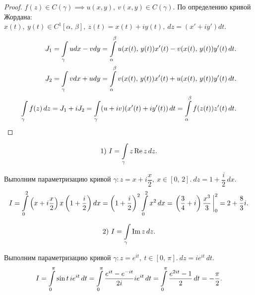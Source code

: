 	\begin{proof}
		$f(z)\in C(\gamma)\implies u(x, y),\ v(x, y)\in C(\gamma) $. По определению кривой Жордана: $x(t),\ y(t)\in C^1[\alpha,\,\beta],\ z(t)= x(t) + iy(t),\ dz = (x' + iy')dt$.
		\begin{align*}
			J_1 = \int\limits_\gamma udx-vdy = \int\limits_\alpha^\beta u(x(t),\, y(t))x'(t)- v(x(t),\, y(t))y'(t)\,dt.\\
			J_2 = \int\limits_\gamma vdx+udy = \int\limits_\alpha^\beta v(x(t),\, y(t))x'(t)+ u(x(t),\, y(t))y'(t)\,dt.\\
			\int\limits_\gamma f(z)\,dz = J_1 + iJ_2 = \int\limits_\gamma(u+iv)(x'(t) + iy'(t))\,dt = \int\limits_\alpha^\beta f(z(t))z'(t)\,dt.
		\end{align*}
	\end{proof}
	\begin{example}			
			\begin{minipage}{0.4\textwidth}
				\[ 1)\ I = \int\limits_\gamma z\operatorname{Re} z\,dz. \]
			\end{minipage}
			\begin{minipage}{0.4\textwidth}
			\end{minipage}
	\end{example}
	Выполним параметризацию кривой $\gamma:z = x + i\dfrac{x}{2},\ x\in[0,\,2].\ dz = 1+\dfrac{i}{2}\,dx.$
	\[ I = \int\limits_0^2 \left( x+i\frac{x}{2}\right)x\left(1+\frac{i}{2} \right)dx = \left(1+\frac{i}{2} \right)^2\int\limits_0^2 x^2\,dx = \left.\left(\frac{3}{4} + i\right) \frac{x^3}{3}\,\right|_0^2 = 2+\frac{8}{3}i. \]
	\begin{example}			
		\begin{minipage}{0.4\textwidth}
			\[ 2)\ I = \int\limits_\gamma\operatorname{Im} z\,dz. \]
		\end{minipage}
		\begin{minipage}{0.4\textwidth}
		\end{minipage}
	\end{example}
	Выполним параметризацию кривой $\gamma: z = e^{it},\ t\in[0,\,\pi].\ dz = ie^{it}\,dt$.
	\[ I = \int\limits_0^\pi\sin t\,ie^{it}\,dt = \int\limits_0^\pi\frac{e^{it}-e^{-it}}{2i}ie^{it}\,dt =\int\limits_0^\pi \frac{e^{2it}-1}{2}\,dt = -\frac{\pi}{2}. \]
	\newpage
